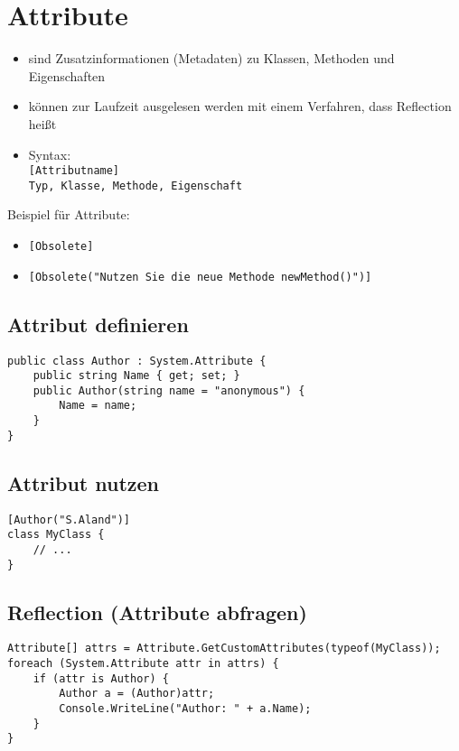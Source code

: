 \section{Attribute}

\begin{itemize}
\item sind Zusatzinformationen (Metadaten) zu Klassen, Methoden und Eigenschaften
\item können zur Laufzeit ausgelesen werden mit einem Verfahren, dass Reflection heißt
\item Syntax:\\
\lstinline`[Attributname]`\\
\lstinline`Typ, Klasse, Methode, Eigenschaft`
\end{itemize}
Beispiel für Attribute:
\begin{itemize}
\item \lstinline`[Obsolete]`
\item \lstinline`[Obsolete("Nutzen Sie die neue Methode newMethod()")]`
\end{itemize}
\subsection{Attribut definieren}
\begin{lstlisting}[language={[Sharp]C}]
public class Author : System.Attribute { 	
	public string Name { get; set; } 
	public Author(string name = "anonymous") {
		Name = name; 
	} 
} 
\end{lstlisting}

\subsection{Attribut nutzen}

\begin{lstlisting}[language={[Sharp]C}]
[Author("S.Aland")] 
class MyClass { 
	// ...
}
\end{lstlisting}

\subsection{Reflection (Attribute abfragen)}
\begin{lstlisting}[language={[Sharp]C}]
Attribute[] attrs = Attribute.GetCustomAttributes(typeof(MyClass));
foreach (System.Attribute attr in attrs) { 
	if (attr is Author) { 
		Author a = (Author)attr; 
		Console.WriteLine("Author: " + a.Name); 
	} 
}
\end{lstlisting}

